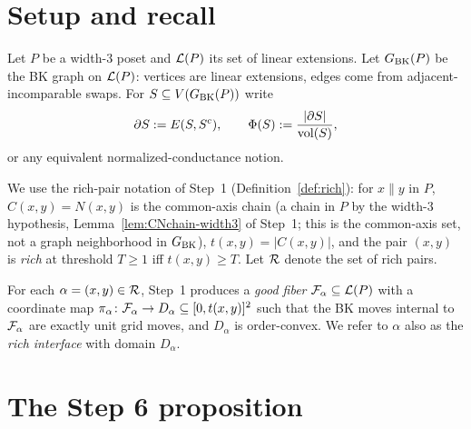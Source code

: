 
\begin{abstract}
Step~6 combines the local cut-rigidity lemma (Step~2), the two-interface
incompatibility lemma (Step~4), and the richness dichotomy (Step~5) into a
global dichotomy: any low-conductance cut $S\subseteq\LE(P)$ either has
large BK boundary (contradiction) or has the property that almost all rich
interfaces are pairwise coherent on their overlaps.
\end{abstract}


\section{Setup and recall}

Let $P$ be a width-3 poset and $\mathcal{L}(P)$ its set of linear extensions.
Let $G_{\mathrm{BK}}(P)$ be the BK graph on $\mathcal{L}(P)$: vertices are linear
extensions, edges come from adjacent-incomparable swaps.
For $S\subseteq V(G_{\mathrm{BK}}(P))$ write
\[
\partial S := E(S, S^c), \qquad
\Phi(S) := \frac{|\partial S|}{\operatorname{vol}(S)},
\]
or any equivalent normalized-conductance notion.

We use the rich-pair notation of Step~1 (Definition~\ref{def:rich}):
for $x\parallel y$ in $P$, $C(x,y)=N(x,y)$ is the common-axis chain
(a chain in $P$ by the width-$3$ hypothesis, Lemma~\ref{lem:CNchain-width3}
of Step~1; this is the common-axis set, not a graph neighborhood in
$G_{\mathrm{BK}}$), $t(x,y)=|C(x,y)|$, and the pair $(x,y)$ is \emph{rich} at
threshold $T\ge 1$ iff $t(x,y)\ge T$.
Let $\mathcal{R}$ denote the set of rich pairs.

\begin{definition}
For each $\alpha=(x,y)\in\mathcal{R}$, Step~1 produces a \emph{good fiber}
$\mathcal{F}_{\alpha}\subseteq\mathcal{L}(P)$ with a coordinate map
$\pi_\alpha\colon\mathcal{F}_{\alpha}\to D_\alpha\subseteq [0,t(x,y)]^2$ such
that the BK moves internal to $\mathcal{F}_{\alpha}$ are exactly unit grid
moves, and $D_\alpha$ is order-convex.
We refer to $\alpha$ also as the \emph{rich interface} with domain
$D_\alpha$.
\end{definition}

\section{The Step 6 proposition}

